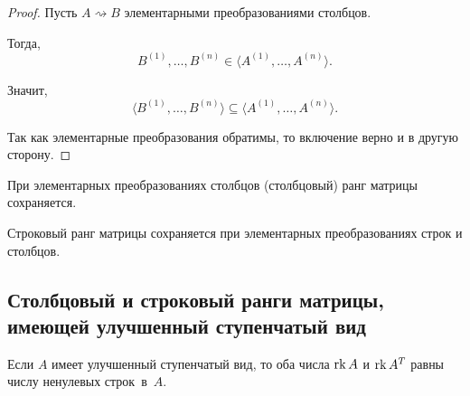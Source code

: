 \begin{proof}
    Пусть $A \rightsquigarrow B$ элементарными преобразованиями столбцов.

    Тогда, 
    \begin{equation*}
        B^{(1)}, \dots, B^{(n)} \in \langle A^{(1)}, \dots, A^{(n)} \rangle
    .\end{equation*}

    Значит, 
    \begin{equation*}
        \langle B^{(1)}, \dots, B^{(n)} \rangle \subseteq \langle A^{(1)}, \dots, A^{(n)} \rangle
    .\end{equation*}

    Так как элементарные преобразования обратимы, то включение верно и в другую сторону.
\end{proof}

\begin{corollary}
    При элементарных преобразованиях столбцов (столбцовый) ранг матрицы сохраняется.
\end{corollary}

\begin{corollary}
    Строковый ранг матрицы сохраняется при элементарных преобразованиях строк и столбцов.
\end{corollary}


\subsection{Столбцовый и строковый ранги матрицы, имеющей улучшенный ступенчатый вид}

\begin{proposal}
    Если $A$ имеет улучшенный ступенчатый вид, то оба числа $\operatorname{\mathop{\mathrm{rk}}} A$ и $\operatorname{\mathop{\mathrm{rk}}} A^T$ равны числу ненулевых строк~в~$A$.
\end{proposal}

